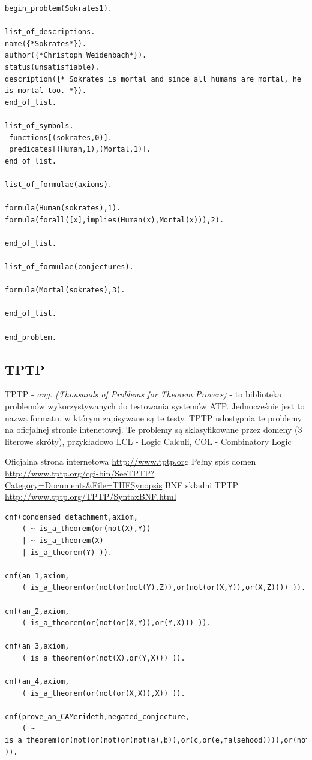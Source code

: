 \documentclass[a4paper,12pt]{article}
\begin{document}
\begin{lstlisting}[caption={Przykład pliku w składni SPASS}]
begin_problem(Sokrates1).

list_of_descriptions.
name({*Sokrates*}).
author({*Christoph Weidenbach*}).
status(unsatisfiable).
description({* Sokrates is mortal and since all humans are mortal, he is mortal too. *}).
end_of_list.

list_of_symbols.
 functions[(sokrates,0)].
 predicates[(Human,1),(Mortal,1)].
end_of_list.

list_of_formulae(axioms).

formula(Human(sokrates),1).
formula(forall([x],implies(Human(x),Mortal(x))),2).

end_of_list.

list_of_formulae(conjectures).

formula(Mortal(sokrates),3).

end_of_list.

end_problem.
\end{lstlisting}

\subsection{TPTP}

TPTP - \textit{ ang. (Thousands of Problems for Theorem Provers)} - to biblioteka problemów wykorzystywanych do testowania systemów ATP. Jednocześnie jest to nazwa formatu, w którym zapisywane są te testy. TPTP udostępnia te problemy na oficjalnej stronie intenetowej.
Te problemy są sklasyfikowane przez domeny (3 literowe skróty), przykładowo
LCL - Logic Calculi,
COL - Combinatory Logic

\noindent
Oficjalna strona internetowa \url{http://www.tptp.org}
\newline
Pełny spis domen \url{http://www.tptp.org/cgi-bin/SeeTPTP?Category=Documents&File=THFSynopsis}
\newline
BNF składni TPTP \url{http://www.tptp.org/TPTP/SyntaxBNF.html}

\begin{lstlisting}[caption={Przykład pliku w składni TPTP}]
% File     : LCL001-1 : TPTP v7.2.0. Released v1.0.0.
cnf(condensed_detachment,axiom,
    ( ~ is_a_theorem(or(not(X),Y))
    | ~ is_a_theorem(X)
    | is_a_theorem(Y) )).

cnf(an_1,axiom,
    ( is_a_theorem(or(not(or(not(Y),Z)),or(not(or(X,Y)),or(X,Z)))) )).

cnf(an_2,axiom,
    ( is_a_theorem(or(not(or(X,Y)),or(Y,X))) )).

cnf(an_3,axiom,
    ( is_a_theorem(or(not(X),or(Y,X))) )).

cnf(an_4,axiom,
    ( is_a_theorem(or(not(or(X,X)),X)) )).

cnf(prove_an_CAMerideth,negated_conjecture,
    ( ~ is_a_theorem(or(not(or(not(or(not(a),b)),or(c,or(e,falsehood)))),or(not(or(not(e),a)),or(c,or(falsehood,a))))) )).

\end{lstlisting}
\end{document}
